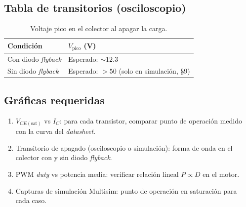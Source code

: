 \documentclass[11pt]{article}
\begin{document}
\subsection{Tabla de transitorios (osciloscopio)}
\begin{table}[H]\centering
\caption{Voltaje pico en el colector al apagar la carga.}
\begin{tabular}{ll}
\toprule
Condición & $V_\text{pico}$ (V) \\
\midrule
Con diodo \emph{flyback} & Esperado: $\sim 12.3$ \\
Sin diodo \emph{flyback} & Esperado: $> 50$ (solo en simulación, \S9) \\
\bottomrule
\end{tabular}
\end{table}

\subsection{Gráficas requeridas}
\begin{enumerate}
  \item $V_{CE(\text{sat})}$ vs $I_C$: para cada transistor, comparar punto de operación
        medido con la curva del \emph{datasheet}.
  \item Transitorio de apagado (osciloscopio o simulación): forma de onda en el colector
        con y sin diodo \emph{flyback}.
  \item PWM \emph{duty} vs potencia media: verificar relación lineal $P\propto D$ en el
        motor.
  \item Capturas de simulación Multisim: punto de operación en saturación para cada caso.
\end{enumerate}

\end{document}
